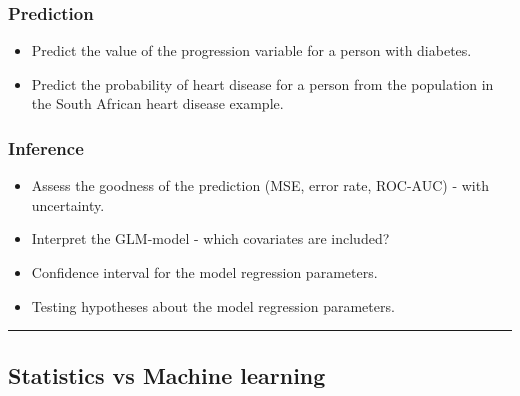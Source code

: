 \documentclass[
  letterpaper,
  DIV=11,
  numbers=noendperiod]{scrartcl}
\providecommand{\tightlist}{%
  \setlength{\itemsep}{0pt}\setlength{\parskip}{0pt}}\usepackage{longtable,booktabs,array}
\begin{document}
\hypertarget{prediction}{%
\subsubsection{Prediction}\label{prediction}}

\begin{itemize}
\tightlist
\item
  Predict the value of the progression variable for a person with
  diabetes.
\item
  Predict the probability of heart disease for a person from the
  population in the South African heart disease example.
\end{itemize}

\hypertarget{inference}{%
\subsubsection{Inference}\label{inference}}

\begin{itemize}
\tightlist
\item
  Assess the goodness of the prediction (MSE, error rate, ROC-AUC) -
  with uncertainty.
\item
  Interpret the GLM-model - which covariates are included?
\item
  Confidence interval for the model regression parameters.
\item
  Testing hypotheses about the model regression parameters.
\end{itemize}

\begin{center}\rule{0.5\linewidth}{0.5pt}\end{center}

\hypertarget{statistics-vs-machine-learning}{%
\subsection{Statistics vs Machine
learning}\label{statistics-vs-machine-learning}}
\end{document}
